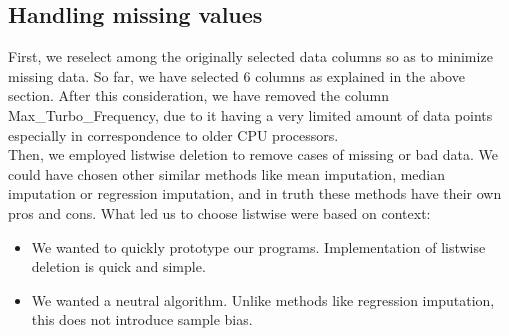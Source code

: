 \subsection{Handling missing values}

First, we reselect among the originally selected data columns so as to minimize missing data. So far, we have selected 6 columns as explained in the above section. After this consideration, we have removed the column Max\_Turbo\_Frequency, due to it having a very limited amount of data points especially in correspondence to older CPU processors.\\

Then, we employed listwise deletion to remove cases of missing or bad data. We could have chosen other similar methods like mean imputation, median imputation or regression imputation, and in truth these methods have their own pros and cons. What led us to choose listwise were based on context:
\begin{itemize}
    \item We wanted to quickly prototype our programs. Implementation of listwise deletion is quick and simple.
    \item We wanted a neutral algorithm. Unlike methods like regression imputation, this does not introduce sample bias.
\end{itemize}

